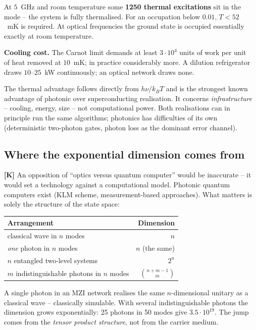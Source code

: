 At $5$~GHz and room temperature some \textbf{1250 thermal excitations} sit
in the mode -- the system is fully thermalised. For an occupation below
$0.01$, $T < 52$~mK is required. At optical frequencies the ground state is
occupied essentially exactly at room temperature.

\textbf{Cooling cost.} The Carnot limit demands at least $3\cdot10^{4}$
units of work per unit of heat removed at $10$~mK; in practice considerably
more. A dilution refrigerator draws $10$--$25$~kW continuously; an optical
network draws none.

\begin{keyresult}
The thermal advantage follows directly from $h\nu/k_BT$ and is the
strongest known advantage of photonic over superconducting realisation. It
concerns \emph{infrastructure} -- cooling, energy, size -- not computational
power. Both realisations can in principle run the same algorithms;
photonics has difficulties of its own (deterministic two-photon gates,
photon loss as the dominant error channel).
\end{keyresult}

\subsection{Where the exponential dimension comes from}

\textbf{[K]} An opposition of \enquote{optics versus quantum computer}
would be inaccurate -- it would set a technology against a computational
model. Photonic quantum computers exist (KLM scheme, measurement-based
approaches). What matters is solely the structure of the state space:

\begin{center}
\begin{tabular}{lr}
\toprule
Arrangement & Dimension \\
\midrule
classical wave in $n$ modes & $n$ \\
\emph{one} photon in $n$ modes & $n$ \quad(the same) \\
$n$ entangled two-level systems & $2^n$ \\
$m$ indistinguishable photons in $n$ modes & $\binom{n+m-1}{m}$ \\
\bottomrule
\end{tabular}
\end{center}

A single photon in an MZI network realises the same $n$-dimensional unitary
as a classical wave -- classically simulable. With several indistinguishable
photons the dimension grows exponentially: 25 photons in 50 modes give
$3.5\cdot10^{19}$. The jump comes from the \emph{tensor product structure},
not from the carrier medium.

